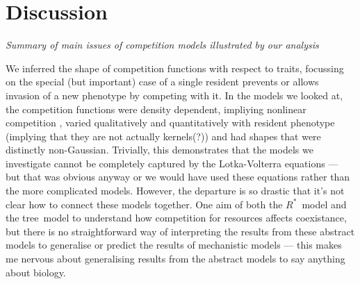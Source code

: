 \documentclass[a4paper,11pt]{article}
\newcommand{\Rstar}{\ensuremath{R^*}}
\newcommand{\TREE}{{\sc tree}}
\begin{document}
\clearpage
\section{Discussion}

\textit{Summary of main issues of competition models illustrated by
  our analysis}

We inferred the shape of competition functions with respect to traits,
focussing on the special (but important) case of a single resident
prevents or allows invasion of a new phenotype by competing with it.
In the models we looked at, the competition functions were density
dependent, impliying nonlinear competition \citep{Abrams-1980}, varied
qualitatively and quantitatively with resident phenotype (implying
that they are not actually kernels(?)) and had shapes that were
distinctly non-Gaussian.
Trivially, this demonstrates that the models we investigate cannot be
completely captured by the Lotka-Volterra equations --- but that was
obvious anyway or we would have used these equations rather than the
more complicated models.  However, the departure is so drastic that
it's not clear how to connect these models together.  One aim of both
the \Rstar\ model and the \TREE\ model to understand how competition
for resources affects coexistance, but there is no straightforward way
of interpreting the results from these abstract models to generalise
or predict the results of mechanistic models --- this makes me nervous
about generalising results from the abstract models to say anything
about biology.
\end{document}
